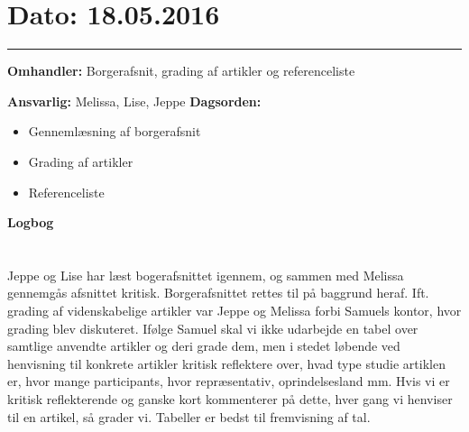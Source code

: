 \section{Dato: 18.05.2016}
\hrule

\textbf{Omhandler:} Borgerafsnit, grading af artikler og referenceliste

\textbf{Ansvarlig:} Melissa, Lise, Jeppe
\textbf{Dagsorden:}
\begin{itemize}
	\item Gennemlæsning af borgerafsnit
	\item Grading af artikler 
	\item Referenceliste
	
\end{itemize}

\textbf{Logbog}
\\
\\ \\
Jeppe og Lise har læst bogerafsnittet igennem, og sammen med Melissa gennemgås afsnittet kritisk. Borgerafsnittet rettes til på baggrund heraf. 
Ift. grading af videnskabelige artikler var Jeppe og Melissa forbi Samuels kontor, hvor grading blev diskuteret. Ifølge Samuel skal vi ikke udarbejde en tabel over samtlige anvendte artikler og deri grade dem, men i stedet løbende ved henvisning til konkrete artikler kritisk reflektere over, hvad type studie artiklen er, hvor mange participants, hvor repræsentativ, oprindelsesland mm. Hvis vi er kritisk reflekterende og ganske kort kommenterer på dette, hver gang vi henviser til en artikel, så grader vi. 
Tabeller er bedst til fremvisning af tal.
